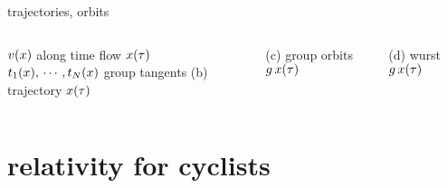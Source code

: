 \begin{frame}{trajectories, orbits}
\begin{columns}[t]
\medskip

$v(x)$ along time flow $x(\tau)$
\\
$t_1(x),\, \cdots, t_N(x)$
group tangents
(b) trajectory $x(\tau)$

\medskip

(c) group orbits $g\,x(\tau)$

\medskip

(d) wurst $g\,x(\tau)$
	\end{columns}
\end{frame}

\section[relativity for cyclists]{relativity for cyclists}

\subsection[in/equivariance]{}

